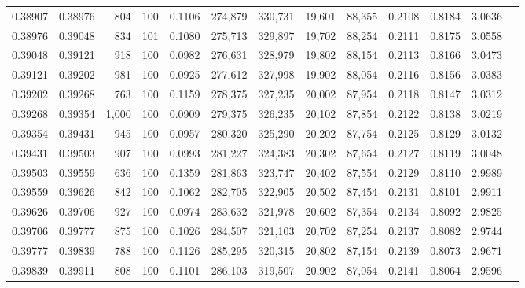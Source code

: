 \begin{tabular}{rrrrrrrrrrrrr}
0.38907 & 0.38976 &   804 & 100 &                                     0.1106 & 274,879 & 330,731 &  19,601 &  88,355 & 0.2108 & 0.8184 & 3.0636 \\
0.38976 & 0.39048 &   834 & 101 &                                     0.1080 & 275,713 & 329,897 &  19,702 &  88,254 & 0.2111 & 0.8175 & 3.0558 \\
0.39048 & 0.39121 &   918 & 100 &                                     0.0982 & 276,631 & 328,979 &  19,802 &  88,154 & 0.2113 & 0.8166 & 3.0473 \\
0.39121 & 0.39202 &   981 & 100 &                                     0.0925 & 277,612 & 327,998 &  19,902 &  88,054 & 0.2116 & 0.8156 & 3.0383 \\
0.39202 & 0.39268 &   763 & 100 &                                     0.1159 & 278,375 & 327,235 &  20,002 &  87,954 & 0.2118 & 0.8147 & 3.0312 \\
0.39268 & 0.39354 & 1,000 & 100 &                                     0.0909 & 279,375 & 326,235 &  20,102 &  87,854 & 0.2122 & 0.8138 & 3.0219 \\
0.39354 & 0.39431 &   945 & 100 &                                     0.0957 & 280,320 & 325,290 &  20,202 &  87,754 & 0.2125 & 0.8129 & 3.0132 \\
0.39431 & 0.39503 &   907 & 100 &                                     0.0993 & 281,227 & 324,383 &  20,302 &  87,654 & 0.2127 & 0.8119 & 3.0048 \\
0.39503 & 0.39559 &   636 & 100 &                                     0.1359 & 281,863 & 323,747 &  20,402 &  87,554 & 0.2129 & 0.8110 & 2.9989 \\
0.39559 & 0.39626 &   842 & 100 &                                     0.1062 & 282,705 & 322,905 &  20,502 &  87,454 & 0.2131 & 0.8101 & 2.9911 \\
0.39626 & 0.39706 &   927 & 100 &                                     0.0974 & 283,632 & 321,978 &  20,602 &  87,354 & 0.2134 & 0.8092 & 2.9825 \\
0.39706 & 0.39777 &   875 & 100 &                                     0.1026 & 284,507 & 321,103 &  20,702 &  87,254 & 0.2137 & 0.8082 & 2.9744 \\
0.39777 & 0.39839 &   788 & 100 &                                     0.1126 & 285,295 & 320,315 &  20,802 &  87,154 & 0.2139 & 0.8073 & 2.9671 \\
0.39839 & 0.39911 &   808 & 100 &                                     0.1101 & 286,103 & 319,507 &  20,902 &  87,054 & 0.2141 & 0.8064 & 2.9596 \\

\end{tabular}
